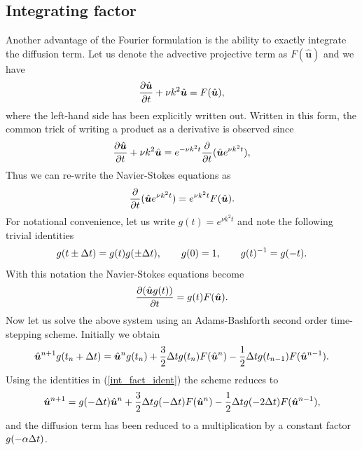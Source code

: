 \subsection{Integrating factor}
Another advantage of the Fourier formulation is the ability to exactly integrate the diffusion term. Let us denote the advective projective term as $F(\hat{\bm{u}})$ and we have
\begin{align}
\frac{\partial \hat{\bm{u}}}{\partial t} + \nu k^{2}\hat{\bm{u}} = F(\hat{\bm{u}}) ,
\end{align}
where the left-hand side has been explicitly written out. Written in this form, the common trick of writing a product as a derivative is observed since
\begin{align}
 \frac{\partial \hat{\bm{u}}}{\partial t} + \nu k^{2}\hat{\bm{u}}= e^{-\nu k^{2}t}\frac{\partial }{\partial t}(\hat{\bm{u}} e^{\nu k^{2}t}),
\end{align}
Thus we can re-write the Navier-Stokes equations as 
\begin{align}
\frac{\partial }{\partial t}(\hat{\bm{u}} e^{\nu k^{2}t})= e^{\nu k^{2}t}F(\hat{\bm{u}}).
\end{align}
For notational convenience, let us write $g(t) = e^{\nu k^{2}t}$ and note the following trivial identities
\begin{align}
g(t\pm\Delta t) = g(t)g(\pm\Delta t),\qquad g(0) = 1, \qquad g(t)^{-1} = g(-t).\label{int_fact_ident}
\end{align}
With this notation the Navier-Stokes equations become
\begin{align}
\frac{\partial (\hat{\bm{u}} g(t))}{\partial t} = g(t)F(\hat{\bm{u}}).
\end{align}
 Now let us solve the above system using an Adams-Bashforth second order time-stepping scheme. Initially we obtain
\begin{align}
\hat{\bm{u}}^{n+1}g(t_{n}+\Delta t) = \hat{\bm{u}}^{n}g(t_{n}) + \frac{3}{2}\Delta t g(t_{n})F(\hat{\bm{u}}^{n}) - \frac{1}{2}\Delta t g(t_{n-1})F(\hat{\bm{u}}^{n-1}).
\end{align}
Using the identities in (\ref{int_fact_ident}) the scheme reduces to
\begin{align}
\hat{\bm{u}}^{n+1} = g(-\Delta t)\hat{\bm{u}}^{n} + \frac{3}{2}\Delta t g(-\Delta t)F(\hat{\bm{u}}^{n}) - \frac{1}{2}\Delta t g(-2\Delta t)F(\hat{\bm{u}}^{n-1}),
\end{align}
and the diffusion term has been reduced to a multiplication by a constant factor $g(-\alpha\Delta t)$.

